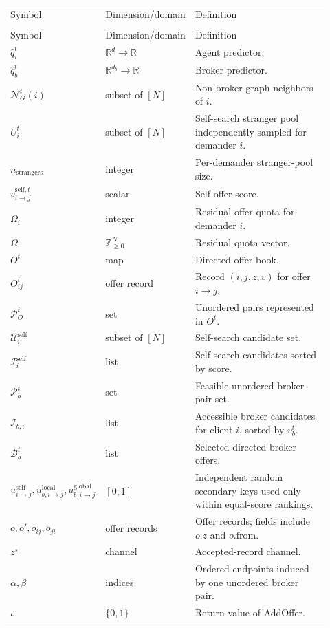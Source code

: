 \documentclass[11pt]{article}
\makeatletter
\newcommand{\R}{\mathbb{R}}
\newcommand{\procAddOffer}{AddOffer}
\newcommand{\procOfferMarket}{OfferMarket}
\newenvironment{localvartable}[1]{%
\begingroup
\small
\setlength{\tabcolsep}{4pt}
\renewcommand{\arraystretch}{1.08}
\begin{longtable}{>{\raggedright\arraybackslash}p{0.23\linewidth}
                >{\raggedright\arraybackslash}p{0.18\linewidth}
                >{\raggedright\arraybackslash}p{0.51\linewidth}}
\toprule
\multicolumn{3}{@{}l}{\textit{Local variables for #1}}\\
\midrule
Symbol & Dimension/domain & Definition \\
\midrule
\endfirsthead
\toprule
\multicolumn{3}{@{}l}{\textit{Local variables for #1 (continued)}}\\
\midrule
Symbol & Dimension/domain & Definition \\
\midrule
\endhead
}{%
\bottomrule
\end{longtable}
\endgroup
}
\makeatother
\begin{document}
\begin{localvartable}{\procOfferMarket}
$\hat q_i^t$ & $\R^d\to\R$ & Agent predictor. \\
$\hat q_b^t$ & $\R^{d_b}\to\R$ & Broker predictor. \\
$\mathcal N_G^t(i)$ & subset of $[N]$ & Non-broker graph neighbors of $i$. \\
$U_i^t$ & subset of $[N]$ & Self-search stranger pool independently sampled for demander $i$. \\
$n_{\mathrm{strangers}}$ & integer & Per-demander stranger-pool size. \\
$v_{i\to j}^{\mathrm{self},t}$ & scalar & Self-offer score. \\
$\Omega_i$ & integer & Residual offer quota for demander $i$. \\
$\Omega$ & $\mathbb Z_{\ge0}^N$ & Residual quota vector. \\
$O^t$ & map & Directed offer book. \\
$O_{ij}^t$ & offer record & Record $(i,j,z,v)$ for offer $i\to j$. \\
$\mathcal P_O^t$ & set & Unordered pairs represented in $O^t$. \\
$\mathcal U_i^{\mathrm{self}}$ & subset of $[N]$ & Self-search candidate set. \\
$\mathcal I_i^{\mathrm{self}}$ & list & Self-search candidates sorted by score. \\
$\mathcal P_b^t$ & set & Feasible unordered broker-pair set. \\
$\mathcal I_{b,i}$ & list & Accessible broker candidates for client $i$, sorted by $v_b^t$. \\
$\mathcal B_b^t$ & list & Selected directed broker offers. \\
$u_{i\to j}^{\mathrm{self}},u_{b,i\to j}^{\mathrm{local}},u_{b,i\to j}^{\mathrm{global}}$ & $[0,1]$ & Independent random secondary keys used only within equal-score rankings. \\
$o,o',o_{ij},o_{ji}$ & offer records & Offer records; fields include $o.z$ and $o.\mathrm{from}$. \\
$z^\star$ & channel & Accepted-record channel. \\
$\alpha,\beta$ & indices & Ordered endpoints induced by one unordered broker pair. \\
$\iota$ & $\{0,1\}$ & Return value of \procAddOffer. \\
\end{localvartable}
\end{document}
